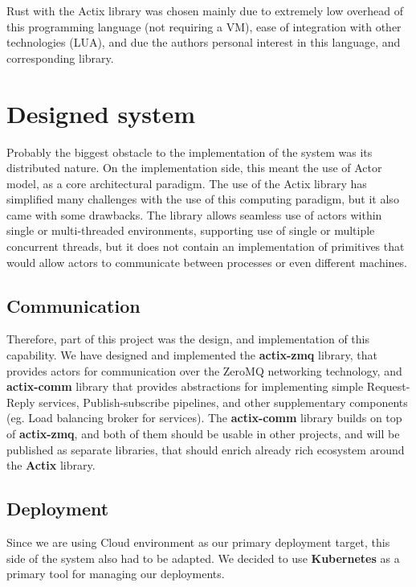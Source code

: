 \documentclass{ExcelAtFIT}
\begin{document}
    Rust with the Actix library was chosen mainly due to extremely low overhead of this programming language (not requiring a VM),
    ease of integration with other technologies (LUA), and due the authors personal interest in this language, and corresponding library.

    \section{Designed system}
    Probably the biggest obstacle to the implementation of the system was its distributed nature. On the implementation side, this meant the use of Actor model, as a
    core architectural paradigm. The use of the Actix library has simplified many challenges with the use of this computing paradigm, but it also
    came with some drawbacks. The library allows seamless use of actors within single or multi-threaded environments,
    supporting use of single or multiple concurrent threads, but it does not contain an implementation of primitives that would allow actors to communicate between processes
    or even different machines.

    \subsection{Communication}
    Therefore, part of this project was the design, and implementation of this capability. We have designed and implemented the \textbf{actix-zmq} library, that
    provides actors for communication over the ZeroMQ networking technology, and \textbf{actix-comm} library that provides abstractions
    for implementing simple Request-Reply services, Publish-subscribe pipelines, and other supplementary components (eg. Load balancing broker for services).
    The \textbf{actix-comm} library builds on top of \textbf{actix-zmq}, and both of them should be usable in other projects, and will be published
    as separate libraries, that should enrich already rich ecosystem around the \textbf{Actix} library.

    \subsection{Deployment}
    Since we are using Cloud environment as our primary deployment target, this side of the system also had to be adapted.
    We decided to use \textbf{Kubernetes} as a primary tool for managing our deployments.
\end{document}

